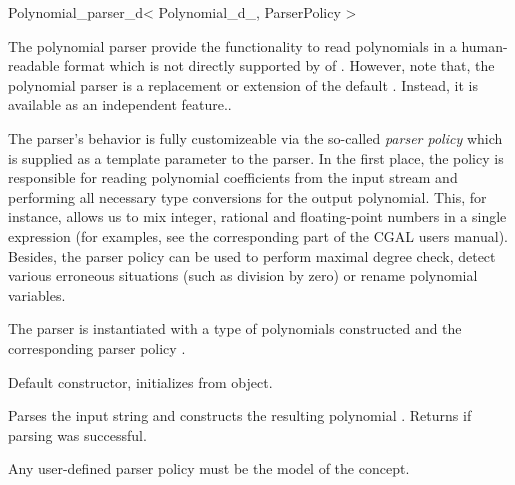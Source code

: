 % 
% 

\begin{ccRefClass}{Polynomial_parser_d< Polynomial_d_, ParserPolicy >}
\def\ccTagOperatorLayout{\ccFalse}


\ccDefinition

The polynomial parser provide the functionality to read polynomials in a human-readable format which
is not directly supported by  of . However, note that,
the polynomial parser is  a replacement or extension of the default . Instead,
it is available as an independent feature..

The parser's behavior is fully customizeable via the so-called {\em parser policy} 
which is supplied as a template parameter to the parser. 
In the first place, the policy is responsible for reading polynomial 
coefficients from the input stream and performing all necessary type conversions
for the output polynomial. This, for instance, allows us to mix integer, rational and 
floating-point numbers in a single expression (for examples, see the corresponding part of 
the CGAL users manual).
Besides, the parser policy can be used to perform maximal degree check,
detect various erroneous situations (such as division by zero) 
or rename polynomial variables.

\ccParameters
The parser is instantiated with a type 
of polynomials constructed  and the corresponding parser policy . 


\ccCreation
{}

% 

{Default constructor, initializes from  object.}

\ccOperations

{Parses the input string  and constructs the resulting polynomial . 
Returns  if parsing was successful.} 

Any user-defined parser policy must be the model of the 
concept.

\ccSeeAlso
{}

\end{ccRefClass}

